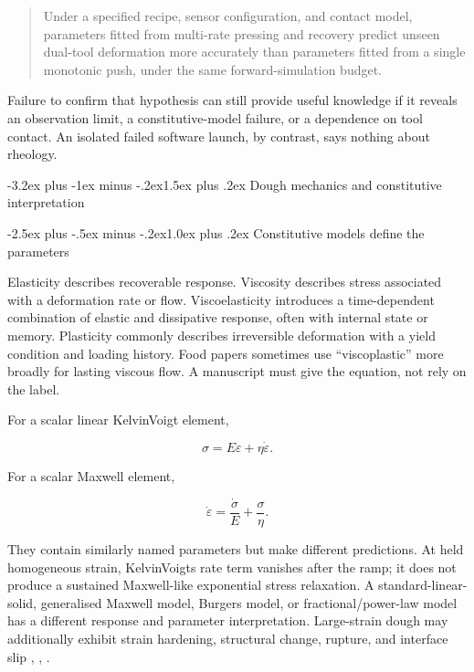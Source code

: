 \documentclass[
  11pt,
]{article}
\makeatletter
\renewcommand\section{\needspace{7\baselineskip}\@startsection{section}{1}{\z@}%
  {-3.2ex plus -1ex minus -.2ex}{1.5ex plus .2ex}%
  {\normalfont\sffamily\Large\bfseries\color{accent}}}
\renewcommand\subsection{\needspace{5\baselineskip}\@startsection{subsection}{2}{\z@}%
  {-2.5ex plus -.5ex minus -.2ex}{1.0ex plus .2ex}%
  {\normalfont\sffamily\large\bfseries\color{accent}}}
\makeatother
\begin{document}
\begin{quote}
Under a specified recipe, sensor configuration, and contact model,
parameters fitted from multi-rate pressing and recovery predict unseen
dual-tool deformation more accurately than parameters fitted from a
single monotonic push, under the same forward-simulation budget.
\end{quote}

Failure to confirm that hypothesis can still provide useful knowledge if
it reveals an observation limit, a constitutive-model failure, or a
dependence on tool contact. An isolated failed software launch, by
contrast, says nothing about rheology.

\section{Dough mechanics and constitutive
interpretation}\label{dough-mechanics-and-constitutive-interpretation}

\subsection{Constitutive models define the
parameters}\label{constitutive-models-define-the-parameters}

Elasticity describes recoverable response. Viscosity describes stress
associated with a deformation rate or flow. Viscoelasticity introduces a
time-dependent combination of elastic and dissipative response, often
with internal state or memory. Plasticity commonly describes
irreversible deformation with a yield condition and loading history.
Food papers sometimes use ``viscoplastic'' more broadly for lasting
viscous flow. A manuscript must give the equation, not rely on the
label.

For a scalar linear Kelvin\textendash{}\allowbreak{}Voigt element,

\[
\sigma=E\varepsilon+\eta\dot\varepsilon.
\]

For a scalar Maxwell element,

\[
\dot\varepsilon=\frac{\dot\sigma}{E}+\frac{\sigma}{\eta}.
\]

They contain similarly named parameters but make different predictions.
At held homogeneous strain,
Kelvin\textendash{}\allowbreak{}Voigt\textquotesingle s rate term
vanishes after the ramp; it does not produce a sustained Maxwell-like
exponential stress relaxation. A standard-linear-solid, generalised
Maxwell model, Burgers model, or fractional/power-law model has a
different response and parameter interpretation. Large-strain dough may
additionally exhibit strain hardening, structural change, rupture, and
interface slip ,
, .
\end{document}

